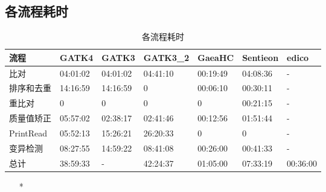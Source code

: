 \documentclass[UTF8,10pt,a4paper]{ctexart}
\begin{document}
\subsection{各流程耗时}

\begin{table}[htp]
\newcommand{\tabincell}[2]{\begin{tabular}{@{}#1@{}}#2\end{tabular}}
{\small
\caption{各流程耗时}
\begin{center}
\begin{tabular}{p{2cm}|p{2cm}|p{2cm}|p{2cm}|p{2cm}|p{2cm}|p{2cm}}
\hline
流程 & GATK4 &  GATK3 & GATK3\_2 & GaeaHC\footnotemark[1] & Sentieon & edico \\
\hline
比对 & 04:01:02 & 04:01:02 & 04:41:10 & 00:19:49 & 04:08:36 & -\\
排序和去重 & 14:16:59 & 14:16:59 & 0 & 00:06:10&  00:30:11 & -\\
重比对  & 0 & 0 & 0 & 0 & 00:21:15 & -\\
质量值矫正 & 05:57:02 & 02:38:17 & 02:41:46 &  00:12:56 &  01:51:44 & - \\
PrintRead & 05:52:13  & 15:26:21 & 26:20:33 & 0 & 0 & -\\
变异检测 & 08:27:55 & 14:59:22 & 08:41:08 & 00:26:00 & 00:41:33 & -\\
总计 & 38:59:33 &  - & 42:24:37 & 01:05:00 & 07:33:19 & 00:36:00\\
\hline
\end{tabular}
\end{center}
\label{default}
}
\begin{itemize}
\item[*] {}
\end{itemize}
\end{table}
\end{document}
